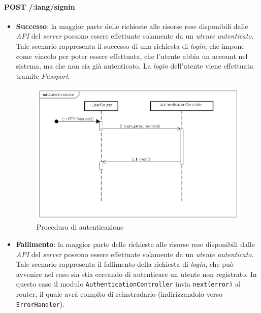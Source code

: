 \paragraph{POST /:lang/signin}
\begin{itemize}
\item \textbf{Successo}: la maggior parte delle richieste alle risorse rese disponibili dalle \textit{API} del \textit{server} possono essere effettuate solamente da un \textit{utente autenticato}. Tale scenario rappresenta il successo di una richiesta di \textit{login}, che impone come vincolo per poter essere effettuata, che l'utente abbia un account nel sistema, ma che non sia già autenticato. La \textit{login} dell'utente viene effettuata tramite \textit{Passport}.

\label{Procedura di autenticazione}
\begin{figure}[ht]
	\centering
	\includegraphics[scale=0.40]{UML/DiagrammiDiSequenza/Back-end/POST__lang_signin_success.png}
	\caption{Procedura di autenticazione}
\end{figure}
\FloatBarrier
 
\item \textbf{Fallimento}: la maggior parte delle richieste alle risorse rese disponibili dalle \textit{API} del \textit{server} possono essere effettuate solamente da un \textit{utente autenticato}. Tale scenario rappresenta il fallimento della richiesta di \textit{login}, che può avvenire nel caso sia stia cercando di autenticare un utente non registrato. In questo caso il modulo \texttt{AuthenticationController} invia \texttt{next(error)} al router, il quale avrà compito di reinstradarlo (indirizzandolo verso \texttt{ErrorHandler}).


\end{itemize}

